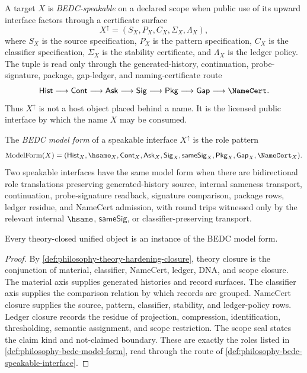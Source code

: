 \begin{definition}
\label{def:philosophy-bedc-speakable-interface}
A target $X$ is \emph{BEDC-speakable} on a declared scope when public use of
its upward interface factors through a certificate surface
$$
X^{\uparrow}
=
(
S_X,
P_X,
C_X,
\Sigma_X,
\Lambda_X
),
$$
where $S_X$ is the source specification, $P_X$ is the pattern
specification, $C_X$ is the classifier specification, $\Sigma_X$ is the
stability certificate, and $\Lambda_X$ is the ledger policy. The tuple is
read only through the generated-history, continuation, probe-signature,
package, gap-ledger, and naming-certificate route
$$
\mathsf{Hist}
\longrightarrow
\mathsf{Cont}
\longrightarrow
\mathsf{Ask}
\longrightarrow
\mathsf{Sig}
\longrightarrow
\mathsf{Pkg}
\longrightarrow
\mathsf{Gap}
\longrightarrow
\NameCert.
$$
Thus $X^{\uparrow}$ is not a host object placed behind a name. It is the
licensed public interface by which the name $X$ may be consumed.
\end{definition}

\begin{definition}
\label{def:philosophy-bedc-model-form}
The \emph{BEDC model form} of a speakable interface $X^{\uparrow}$ is the
role pattern
$$
\operatorname{ModelForm}(X)
=
(
\mathsf{Hist}_X,
\hsame_X,
\mathsf{Cont}_X,
\mathsf{Ask}_X,
\mathsf{Sig}_X,
\mathsf{sameSig}_X,
\mathsf{Pkg}_X,
\mathsf{Gap}_X,
\NameCert_X
).
$$
Two speakable interfaces have the same model form when there are
bidirectional role translations preserving generated-history source,
internal sameness transport, continuation, probe-signature readback,
signature comparison, package rows, ledger residue, and NameCert
admission, with round trips witnessed only by the relevant internal
$\hsame$, $\mathsf{sameSig}$, or classifier-preserving transport.
\end{definition}

\begin{theorem}
\label{thm:philosophy-speakability-factors-through-model-form}
Every theory-closed unified object is an instance of the BEDC model form.
\end{theorem}
\begin{proof}
By \autoref{def:philosophy-theory-hardening-closure}, theory closure is
the conjunction of material, classifier, NameCert, ledger, DNA, and
scope closure. The material axis supplies generated histories and record
surfaces. The classifier axis supplies the comparison relation by which
records are grouped. NameCert closure supplies the source, pattern,
classifier, stability, and ledger-policy rows. Ledger closure records
the residue of projection, compression, identification, thresholding,
semantic assignment, and scope restriction. The scope seal states the
claim kind and not-claimed boundary. These are exactly the roles listed
in \autoref{def:philosophy-bedc-model-form}, read through the route of
\autoref{def:philosophy-bedc-speakable-interface}.
\end{proof}

